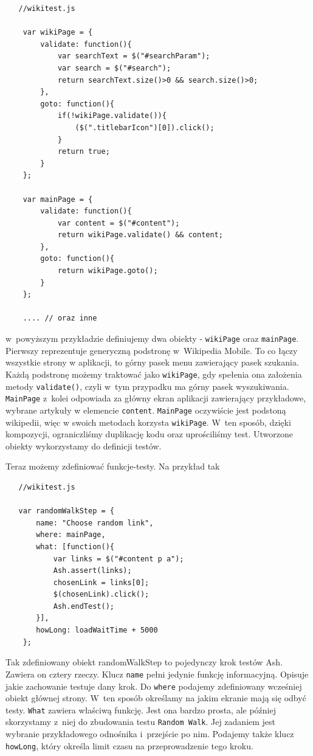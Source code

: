 \documentclass[brudnopis]{xmgr}
\begin{document}
\begin{lstlisting}
   //wikitest.js

    var wikiPage = {
        validate: function(){
            var searchText = $("#searchParam");
            var search = $("#search");
            return searchText.size()>0 && search.size()>0;
        },
        goto: function(){
            if(!wikiPage.validate()){
                ($(".titlebarIcon")[0]).click();
            }
            return true;
        }
    };
    
    var mainPage = {
        validate: function(){
            var content = $("#content");
            return wikiPage.validate() && content;
        },
        goto: function(){
            return wikiPage.goto();
        }
    };

    .... // oraz inne
\end{lstlisting}

w~powyższym przykładzie definiujemy dwa obiekty - \texttt{wikiPage} oraz \texttt{mainPage}. Pierwszy reprezentuje generyczną podstronę w~Wikipedia Mobile. To co łączy wszystkie strony w aplikacji, to górny pasek menu zawierający pasek szukania. Każdą podstronę możemy traktować jako \texttt{wikiPage}, gdy spełenia ona założenia metody \texttt{validate()}, czyli w~tym przypadku ma górny pasek wyszukiwania. \texttt{MainPage} z~kolei odpowiada za główny ekran aplikacji zawierający przykładowe, wybrane artykuły w elemencie \texttt{content}. \texttt{MainPage} oczywiście jest podstoną wikipedii, więc w swoich metodach korzysta \texttt{wikiPage}. W~ten sposób, dzięki kompozycji, ograniczliśmy duplikację kodu oraz uprościliśmy test. Utworzone obiekty wykorzystamy do definicji testów.

Teraz możemy zdefiniować funkcje-testy. Na przykład tak

\begin{lstlisting}
   //wikitest.js

   var randomWalkStep = {
       name: "Choose random link",
       where: mainPage,
       what: [function(){
           var links = $("#content p a");
           Ash.assert(links);
           chosenLink = links[0];
           $(chosenLink).click();
           Ash.endTest();
       }],
       howLong: loadWaitTime + 5000
    };
\end{lstlisting}

Tak zdefiniowany obiekt randomWalkStep to pojedynczy krok testów Ash. Zawiera on cztery rzeczy. Klucz \texttt{name} pełni jedynie funkcję informacyjną. Opisuje jakie zachowanie testuje dany krok. Do \texttt{where} podajemy zdefiniowany wcześniej obiekt głównej strony. W~ten sposób określamy na jakim ekranie mają się odbyć testy. \texttt{What} zawiera właściwą funkcję. Jest ona bardzo prosta, ale później skorzystamy z~niej do zbudowania testu \texttt{Random Walk}. Jej zadaniem jest wybranie przykładowego odnośnika i~przejście po nim. Podajemy także klucz \texttt{howLong}, który określa limit czasu na przeprowadzenie tego kroku.
\end{document}
